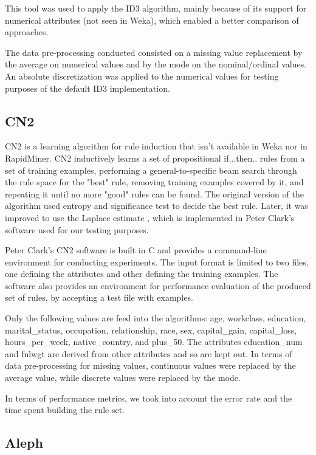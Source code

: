 \documentclass[a4paper]{llncs}
\begin{document}
This tool was used to apply the ID3 \cite{id3}\cite{1} algorithm, mainly because
of its support for numerical attributes (not seen in Weka), which enabled a
better comparison of approaches.

The data pre-processing conducted consisted on a missing value replacement by 
the average on numerical values and by the mode on the nominal/ordinal values. 
An absolute discretization was applied to the numerical values for testing
purposes of the default ID3 implementation.

\subsection{CN2}

CN2 \cite{cn2} is a learning algorithm for rule induction \cite{rule_induction}
that isn't available in Weka nor in RapidMiner. CN2 inductively learns a set of
propositional if...then.. rules from a set of training examples, performing a
general-to-specific beam search through the rule space for the "best" rule, 
removing training examples covered by it, and repeating it until no more "good"
rules can be found. The original version of the algorithm used entropy and
significance test to decide the best rule. Later, it was improved to use the
Laplace estimate \cite{cn2_laplace}, which is implemented in Peter Clark's 
software used for our testing purposes.

Peter Clark's CN2 software is built in C and provides a command-line environment
for conducting experiments. The input format is limited to two files, one
defining the attributes and other defining the training examples. The software 
also provides an environment for performance evaluation of the produced set of 
rules, by accepting a test file with examples.

Only the following values are feed into the algorithms: age, workclass, 
education, marital\_status, occupation, relationship, race, sex, capital\_gain,
capital\_loss, hours\_per\_week, native\_country, and plus\_50. The attributes
education\_num and fnlwgt are derived from other attributes and so are kept out.
In terms of data pre-processing for missing values, continuous values were 
replaced by the average value, while discrete values were replaced by the mode.

In terms of performance metrics, we took into account the error rate and the 
time spent building the rule set. 

\subsection{Aleph}
\end{document}
